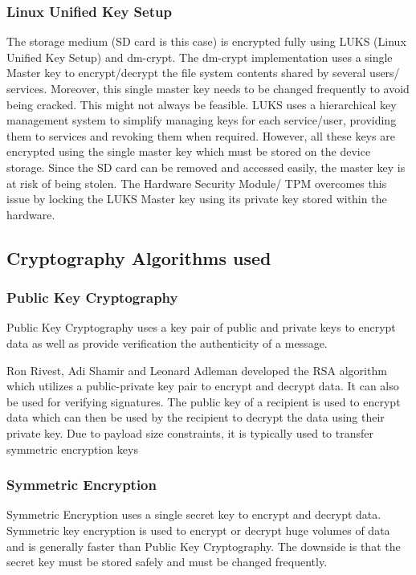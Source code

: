 \documentclass[11pt,openright]{report}
\begin{document}
\subsubsection{Linux Unified Key Setup}
The storage medium (SD card is this case) is encrypted fully using LUKS (Linux Unified Key Setup) and dm-crypt. The dm-crypt implementation uses a single Master key to encrypt/decrypt the file system contents shared by several users/ services. Moreover, this single master key needs to be changed frequently to avoid being cracked. This might not always be feasible. LUKS uses a hierarchical key management system to simplify managing keys for each service/user, providing them to services and revoking them when required. However, all these keys are encrypted using the single master key which must be stored on the device storage. Since the SD card can be removed and accessed easily, the master key is at risk of being stolen. The Hardware Security Module/ TPM overcomes this issue by locking the LUKS Master key using its private key stored within the hardware.

\subsection{Cryptography Algorithms used}
\subsubsection{Public Key Cryptography}
Public Key Cryptography uses a key pair of public and private keys to encrypt data as well as provide verification the authenticity of a message.

Ron Rivest, Adi Shamir and Leonard Adleman developed the RSA algorithm which utilizes a public-private key pair to encrypt and decrypt data. It can also be used for verifying signatures. The public key of a recipient is used to encrypt data which can then be used by the recipient to decrypt the data using their private key. Due to payload size constraints, it is typically used to transfer symmetric encryption keys

\subsubsection{Symmetric Encryption}
Symmetric Encryption uses a single secret key to encrypt and decrypt data. Symmetric key encryption is used to encrypt or decrypt huge volumes of data and is generally faster than Public Key Cryptography. The downside is that the secret key must be stored safely and must be changed frequently.
\end{document}
